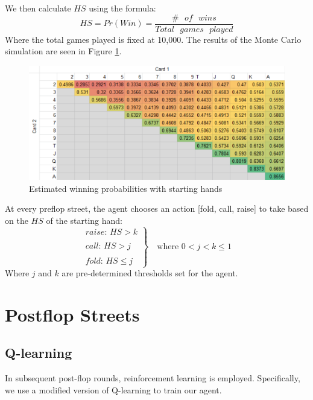 \documentclass{article}
\begin{document}
We then calculate $HS$ using the formula:
\begin{displaymath}
 HS = Pr(Win)= \frac{\# \text{ } of \text{ } wins}{Total \text{ }games \text{ } played}
\end{displaymath}
Where the total games played is fixed at 10,000. The results of the Monte Carlo simulation are seen in Figure \ref{fig:1}.
\begin{figure}
  \includegraphics[width=\linewidth]{WinningProb.PNG}
  \caption{Estimated winning probabilities with starting hands}
  \label{fig:1}
\end{figure}

At every preflop street, the agent chooses an action [fold, call, raise] to take based on the $HS$ of the starting hand:
\begin{displaymath}
  \left.
  \begin{array}{l}
    raise \text{: } HS > k \\
    \\
    call \text{: } HS > j \\
    \\
    fold \text{: } HS \leq j
  \end{array}
  \right\rbrace \quad \text{where } 0 < j < k \leq 1
\end{displaymath}
Where $j$ and $k$ are pre-determined thresholds set for the agent.

\section{Postflop Streets}

\subsection{Q-learning}

In subsequent post-flop rounds, reinforcement learning is employed. Specifically, we use a modified version of Q-learning to train our agent.
\end{document}
